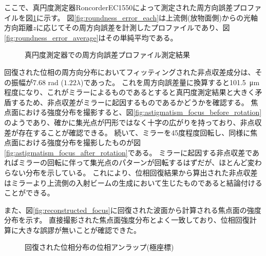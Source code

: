 ここで、真円度測定器RoncorderEC1550によって測定された周方向誤差プロファイルを図\ref{fig:roundness_error}に示す。
図\ref{fig:roundness_error_each}は上流側(放物面側)からの光軸方向距離$z$に応じてその周方向誤差を計測したプロファイルであり、図\ref{fig:roundness_error_average}はその単純平均である。

\begin{figure}[!ht]
\centering
{}
\caption[]{真円度測定器での周方向誤差プロファイル測定結果}
\label{fig:roundness_error}
\end{figure}

回復された位相の周方向分布においてフィッティングされた非点収差成分は、その振幅が7.68 rad ($1.22\lambda$)であった。
これを周方向誤差量に換算すると\SI{101.5}{\micro \metre}程度になり、これがミラーによるものであるとすると真円度測定結果と大きく矛盾するため、非点収差がミラーに起因するものであるかどうかを確認する。
焦点面における強度分布を撮影すると、図\ref{fig:astigmatism_focus_before_rotation}のようであり、確かに集光点が円形ではなく十字の広がりを持っており、非点収差が存在することが確認できる。
続いて、ミラーを45度程度回転し、同様に焦点面における強度分布を撮影したものが図\ref{fig:astigmatism_focus_after_rotation}である。
ミラーに起因する非点収差であればミラーの回転に伴って集光点のパターンが回転するはずだが、ほとんど変わらない分布を示している。
これにより、位相回復結果から算出された非点収差はミラーより上流側の入射ビームの生成において生じたものであると結論付けることができる。

また、図\ref{fig:reconstructed_focus}に回復された波面から計算される焦点面の強度分布を示す。
直接撮影された焦点面強度分布とよく一致しており、位相回復計算に大きな誤謬が無いことが確認できた。


\begin{figure}[!ht]
\centering
{}
\caption[]{回復された位相分布の位相アンラップ(極座標)}
\label{fig:astigmatism_analysis}
\end{figure}


